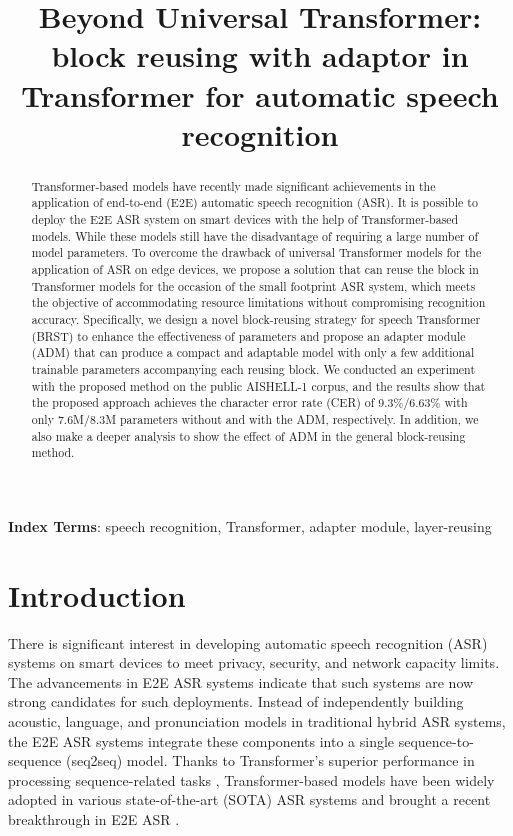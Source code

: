 \documentclass{INTERSPEECH2023}
\title{Beyond Universal Transformer: block reusing with adaptor in Transformer for automatic speech recognition}
\begin{document}
\maketitle
\begin{abstract}
Transformer-based models have recently made significant achievements in the application of end-to-end (E2E) automatic speech recognition (ASR). It is possible to deploy the E2E ASR system on smart devices with the help of Transformer-based models. While these models 
still have the disadvantage of requiring a large number of model parameters. To overcome the drawback of universal Transformer models for the application of ASR on edge devices, we propose a solution that can reuse the block in Transformer models for the occasion of the small footprint ASR system, 
which meets the objective of accommodating resource limitations without compromising recognition accuracy. Specifically, we design a novel block-reusing strategy for speech Transformer (BRST) to enhance the effectiveness of parameters and propose an adapter module (ADM) that can produce a compact and adaptable model with only a few additional trainable parameters accompanying each reusing block. We conducted an experiment with the proposed method on the public AISHELL-1 corpus, and the results show that 
the proposed approach achieves the character  error rate (CER) of 9.3\%/6.63\% with only 7.6M/8.3M parameters without and with the ADM, respectively. In addition, we also make a deeper analysis to show the effect of ADM in the general block-reusing method.
\end{abstract}
\noindent\textbf{Index Terms}: speech recognition, Transformer, adapter module, layer-reusing

\section{Introduction}
There is significant interest in developing automatic speech recognition (ASR) systems on smart devices to meet privacy, security, and network capacity limits. The advancements in E2E ASR systems indicate that such systems are now strong candidates for such deployments. Instead of independently building acoustic, language, and pronunciation models in traditional hybrid ASR systems, the E2E ASR systems integrate these components into a single sequence-to-sequence (seq2seq) model. Thanks to Transformer's \cite{vaswani2017attention} superior performance in processing sequence-related tasks \cite{raffel2020exploring}, Transformer-based models have been widely adopted in various state-of-the-art (SOTA) ASR systems and brought a recent breakthrough in E2E ASR \cite{zhang2020pushing}. 
\end{document}
